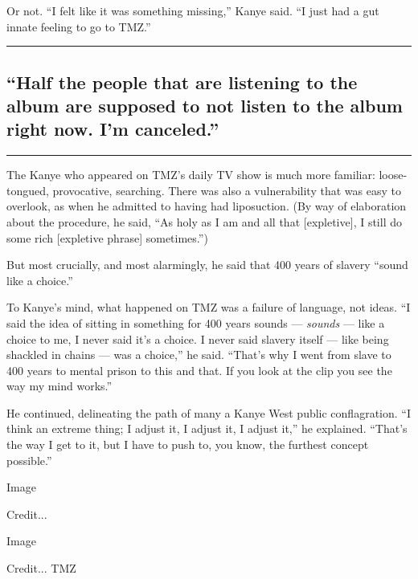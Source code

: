 Or not. ``I felt like it was something missing,'' Kanye said. ``I just
had a gut innate feeling to go to TMZ.''

\begin{center}\rule{0.5\linewidth}{\linethickness}\end{center}

\hypertarget{half-the-people-that-are-listening-to-the-album-are-supposed-to-not-listen-to-the-album-right-now-im-canceled}{%
\subsection{``Half the people that are listening to the album are
supposed to not listen to the album right now. I'm
canceled.''}\label{half-the-people-that-are-listening-to-the-album-are-supposed-to-not-listen-to-the-album-right-now-im-canceled}}

\begin{center}\rule{0.5\linewidth}{\linethickness}\end{center}

The Kanye who appeared on TMZ's daily TV show is much more familiar:
loose-tongued, provocative, searching. There was also a vulnerability
that was easy to overlook, as when he admitted to having had
liposuction. (By way of elaboration about the procedure, he said, ``As
holy as I am and all that {[}expletive{]}, I still do some rich
{[}expletive phrase{]} sometimes.'')

But most crucially, and most alarmingly, he said that 400 years of
slavery ``sound like a choice.''

To Kanye's mind, what happened on TMZ was a failure of language, not
ideas. ``I said the idea of sitting in something for 400 years sounds
--- \emph{sounds} --- like a choice to me, I never said it's a choice. I
never said slavery itself --- like being shackled in chains --- was a
choice,'' he said. ``That's why I went from slave to 400 years to mental
prison to this and that. If you look at the clip you see the way my mind
works.''

He continued, delineating the path of many a Kanye West public
conflagration. ``I think an extreme thing; I adjust it, I adjust it, I
adjust it,'' he explained. ``That's the way I get to it, but I have to
push to, you know, the furthest concept possible.''

Image

Credit...

Image

Credit... TMZ


